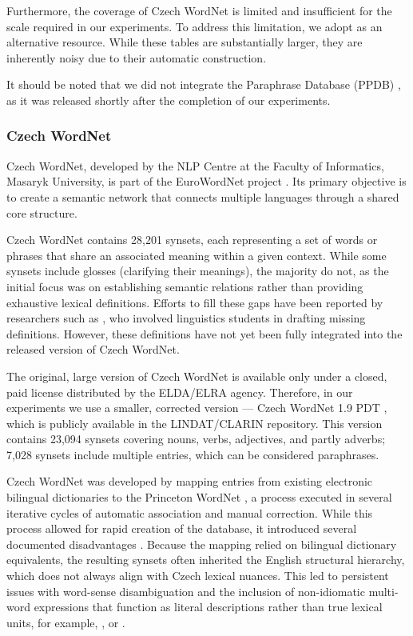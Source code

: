 Furthermore, the coverage of Czech WordNet is limited and insufficient for the scale required in our experiments. To address this limitation, we adopt \textit{\mpt} \citep{meteor-tables} as an alternative resource. While these tables are substantially larger, they are inherently noisy due to their automatic construction. 

It should be noted that we did not integrate the Paraphrase Database (PPDB) \citep{ppdb, pavlick-etal-2015-ppdb}, as it was released shortly after the completion of our experiments.


\subsubsection{Czech WordNet}
Czech WordNet, developed by the NLP Centre at the Faculty of Informatics, Masaryk University, is part of the EuroWordNet project \citep{eurowordnet}. Its primary objective is to create a semantic network that connects multiple languages through a shared core structure.

Czech WordNet contains 28,201 synsets, each representing a set of words or phrases that share an associated meaning within a given context. While some synsets include glosses (clarifying their meanings), the majority do not, as the initial focus was on establishing semantic relations rather than providing exhaustive lexical definitions. Efforts to fill these gaps have been reported by researchers such as \citet{Rambousek:2017}, who involved linguistics students in drafting missing definitions. However, these definitions have not yet been fully integrated into the released version of Czech WordNet.

The original, large version of Czech WordNet is available only under a closed, paid license distributed by the ELDA/ELRA agency. Therefore, in our experiments we use a smaller, corrected version --- Czech WordNet 1.9 PDT \citep{czech_wordnet_pdt}, which is publicly available in the LINDAT/CLARIN repository. This version contains 23,094 synsets covering nouns, verbs, adjectives, and partly adverbs; 7,028 synsets include multiple entries, which can be considered paraphrases.

Czech WordNet was developed by mapping entries from existing electronic bilingual dictionaries to the Princeton WordNet \citep{wordnet,fellbaum98wordnet}, a process executed in several iterative cycles of automatic association and manual correction. While this process allowed for rapid creation of the database, it introduced several documented disadvantages \citep{1489838}. Because the mapping relied on bilingual dictionary equivalents, the resulting synsets often inherited the English structural hierarchy, which does not always align with Czech lexical nuances. This led to persistent issues with word-sense disambiguation and the inclusion of non-idiomatic multi-word expressions that function as literal descriptions rather than true lexical units, for example, ,  or .

